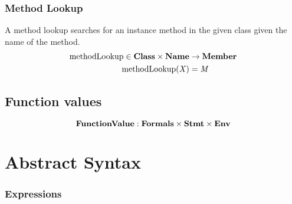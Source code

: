 \documentclass[a4paper,oneside]{article}
\DeclareMathOperator{\methodLookup}{methodLookup}
\begin{document}
\subsubsection{Method Lookup}
\label{subsubsec:method-lookup}

A method lookup searches for an instance method in the given class given the name of the method.
\begin{align*}
    \methodLookup \in \dclass \times \mathbf{Name} &\rightarrow \mathbf{Member}\\
    \methodLookup(\idmeta) &= \membermeta
\end{align*}


\subsection{Function values}
\label{subsec:function-values}

\[
    \mathbf{FunctionValue} : \mathbf{Formals} \times \mathbf{Stmt} \times \mathbf{Env}
\]


\section{Abstract Syntax}
\label{sec:abstract-syntax}


\subsubsection{Expressions}
\label{sec:expr-syntax}


\newcommand{\VariableGet}[1]{#1}
\newcommand{\VariableSet}[2]{#1=#2}

\newcommand{\PropertyGet}[2]{#1.#2}
\newcommand{\PropertySet}[3]{#1.#2=#3}

\newcommand{\DirectPropertyGet}[2]{#1.\{#2\}}
\newcommand{\DirectPropertySet}[3]{#1.\{#2\}=#3}

\newcommand{\SuperPropertyGet}[1]{\tt{super}.#1}
\newcommand{\SuperPropertySet}[2]{\tt{super}.#1=#2}

\newcommand{\StaticGet}[1]{#1}
\newcommand{\StaticSet}[2]{#1=#2}

\newcommand{\InstanceMethodInvocation}[3]{#1.#2(#3)}
\newcommand{\DInstanceMethodInvocation}[3]{#1.\{#2\}(#3)}
\newcommand{\SuperMethodInvocation}[2]{\tt{super}.#1(#2)}
\newcommand{\StaticInvocation}[2]{#1(#2)}

\newcommand{\Not}[1]{!#1}
\newcommand{\AndExpression}[2]{#1\,\&\&\,#2}
\newcommand{\OrExpression}[2]{#1\,||\,#2}
\newcommand{\ConditionalExpression}[3]{#1\,?\,#2\,:\,#3}
\end{document}
